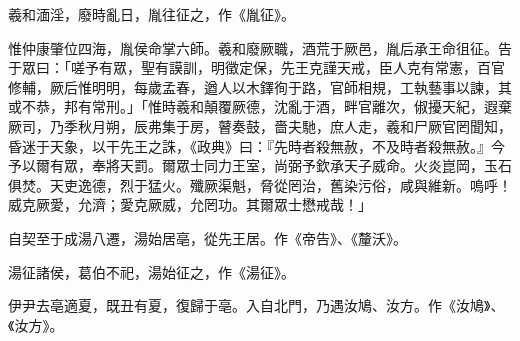 
\begin{pinyinscope}
羲和湎淫，廢時亂日，胤往征之，作《胤征》。

惟仲康肇位四海，胤侯命掌六師。羲和廢厥職，酒荒于厥邑，胤后承王命徂征。告于眾曰：「嗟予有眾，聖有謨訓，明徵定保，先王克謹天戒，臣人克有常憲，百官修輔，厥后惟明明，每歲孟春，遒人以木鐸徇于路，官師相規，工執藝事以諫，其或不恭，邦有常刑。」「惟時羲和顛覆厥德，沈亂于酒，畔官離次，俶擾天紀，遐棄厥司，乃季秋月朔，辰弗集于房，瞽奏鼓，嗇夫馳，庶人走，羲和尸厥官罔聞知，昏迷于天象，以干先王之誅，《政典》曰：『先時者殺無赦，不及時者殺無赦。』今予以爾有眾，奉將天罰。爾眾士同力王室，尚弼予欽承天子威命。火炎崑岡，玉石俱焚。天吏逸德，烈于猛火。殲厥渠魁，脅從罔治，舊染污俗，咸與維新。嗚呼！威克厥愛，允濟；愛克厥威，允罔功。其爾眾士懋戒哉！」

自契至于成湯八遷，湯始居亳，從先王居。作《帝告》、《釐沃》。

湯征諸侯，葛伯不祀，湯始征之，作《湯征》。

伊尹去亳適夏，既丑有夏，復歸于亳。入自北門，乃遇汝鳩、汝方。作《汝鳩》、《汝方》。


\end{pinyinscope}